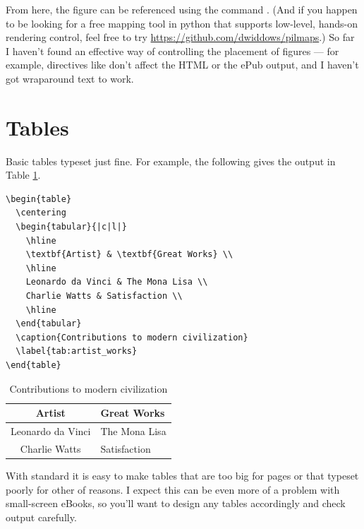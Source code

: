 From here, the figure can be referenced using the command 
. (And if you happen to be looking for a free mapping tool in python that
supports low-level, hands-on rendering control, feel free to try {\small \url{https://github.com/dwiddows/pilmaps}}.) 
So far I haven't found an effective way of controlling the placement of figures --- for example, directives
like  don't affect the HTML or the ePub output, and I haven't got
wraparound text to work.

\section{Tables}

Basic tables typeset just fine. For example, the following \latex gives the output in Table \ref{tab:artist_works}.

\begin{verbatim}
\begin{table}
  \centering
  \begin{tabular}{|c|l|}
    \hline
    \textbf{Artist} & \textbf{Great Works} \\
    \hline
    Leonardo da Vinci & The Mona Lisa \\
    Charlie Watts & Satisfaction \\
    \hline
  \end{tabular}
  \caption{Contributions to modern civilization}
  \label{tab:artist_works}
\end{table}
\end{verbatim}

\begin{table}
 \begin{center}
  \begin{tabular}{|c|l|}
    \hline
    \textbf{Artist} & \textbf{Great Works} \\
    \hline
    Leonardo da Vinci & The Mona Lisa \\
    Charlie Watts & Satisfaction \\
    \hline
  \end{tabular}
  \caption{Contributions to modern civilization}
  \label{tab:artist_works}
 \end{center}
\end{table}

With standard \latex it is easy to make tables that are too big for pages or that typeset poorly for other of reasons.
I expect this can be even more of a problem with small-screen eBooks, so you'll want to design any tables accordingly
and check output carefully.

